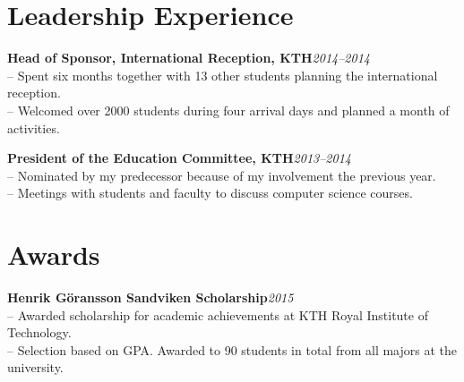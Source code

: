 \documentclass[10pt]{article}
\begin{document}
\section*{Leadership Experience}
\noindent\textbf{Head of Sponsor, International Reception, KTH}\hfill\textit{2014--2014} \\
-- Spent six months together with 13 other students planning the international reception.\\
-- Welcomed over 2000 students during four arrival days and planned a month of activities.

\noindent\textbf{President of the Education Committee, KTH}\hfill\textit{2013--2014} \\
-- Nominated by my predecessor because of my involvement the previous year.\\
-- Meetings with students and faculty to discuss computer science courses.

\section*{Awards}
\textbf{Henrik Göransson Sandviken Scholarship}\hfill\textit{2015}\\
-- Awarded scholarship for academic achievements at KTH Royal Institute of Technology.\\
-- Selection based on GPA. Awarded to 90 students in total from all majors at the university.
\end{document}
